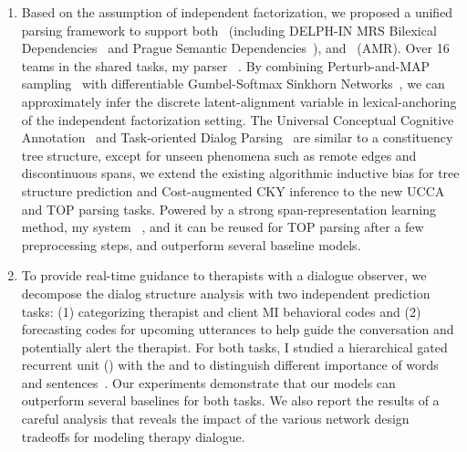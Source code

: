 \begin{enumerate}
\item Based on the assumption of independent factorization, we
  proposed a unified parsing framework to support
  both~ (including DELPH-IN MRS
  Bilexical Dependencies~\citep[DM,][]{ivanova2012did} and Prague
  Semantic
  Dependencies~\citep[PSD,][]{hajic2012announcing,miyao2014house}),
  and ~(AMR). Over 16 teams in the
  shared tasks, my parser~\citep{cao2019amazon} . By combining Perturb-and-MAP
  sampling~\citep{papandreouperturb} with differentiable
  Gumbel-Softmax Sinkhorn Networks~\citep{mena2018learning}, we can
  approximately infer the discrete latent-alignment variable in
  lexical-anchoring of the independent factorization setting. The
   Universal Conceptual Cognitive
  Annotation~\citep[UCCA,][]{abend2013universal} and Task-oriented
  Dialog Parsing~\citep[TOP,][]{gupta-etal-2018-semantic-parsing} are
  similar to a constituency tree structure, except for unseen phenomena
  such as remote edges and discontinuous spans, we extend the existing
  algorithmic inductive bias for tree structure prediction and
  Cost-augmented CKY inference to the new UCCA and TOP parsing
  tasks. Powered by a strong span-representation learning method, my
  system~\citep{cao2019amazon} , and
  it can be reused for TOP parsing after a few preprocessing steps,
  and outperform several baseline models.

\item To provide real-time guidance to therapists with a dialogue
  observer, we decompose the dialog structure analysis with two
  independent prediction tasks: (1) categorizing therapist and client
  MI behavioral codes and (2) forecasting codes for upcoming
  utterances to help guide the conversation and potentially alert the
  therapist. For both tasks, I studied a hierarchical gated recurrent
  unit (\HGRU) with the  and
   to distinguish different importance of
  words and sentences~\citep{jie2019psycdialacl}. Our experiments
  demonstrate that our models can outperform several baselines for
  both tasks. We also report the results of a careful analysis that
  reveals the impact of the various network design tradeoffs for
  modeling therapy dialogue.


\end{enumerate}
